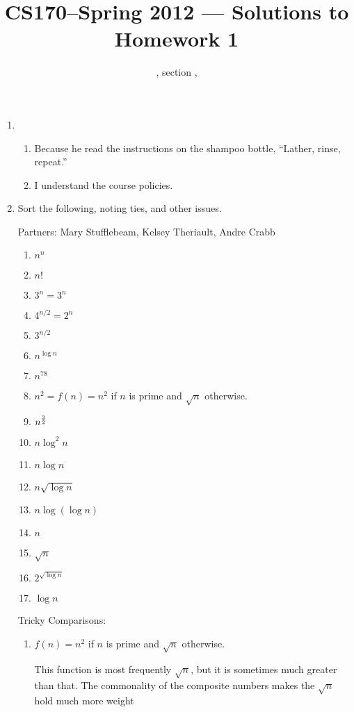 \documentclass[11pt]{article}
\title{CS170--Spring 2012 --- Solutions to Homework 1}
\author{\Name, section \Sec, \texttt{\Login}}
\begin{document}
\maketitle

\begin{enumerate}
\item 

\begin{enumerate}

\item
Because he read the instructions on the shampoo bottle, ``Lather, rinse,
repeat.''

\item 
I understand the course policies.
\end{enumerate}

\newpage

\item 

Sort the following, noting ties, and other issues.

Partners: Mary Stufflebeam, Kelsey Theriault, Andre Crabb
\begin{enumerate}
\item $n^n$
\item $n!$
\item $3^n = 3^n$
\item $4^{n/2} = 2^n$
\item $3^{n/2}$
\item $n^{\log n}$
\item $n^{78}$
\item $n^2  = f(n) = n^2$ if $n$ is prime and $\sqrt{n}$ otherwise.
\item $n^{3\over 2}$
\item $n\log^2n$
\item $n\log n$
\item $n\sqrt{\log n}$
\item $n\log(\log n)$
\item $n$
\item $\sqrt{n}$
\item $2^{\sqrt{\log n}}$
\item $\log n$
\end{enumerate}

Tricky Comparisons:
\begin{enumerate}
\item $f(n) = n^2$ if $n$ is prime and $\sqrt{n}$ otherwise. 

This function is most frequently $\sqrt{n}$, but it is sometimes much greater
than that. The commonality of the composite numbers makes the $\sqrt{n}$ hold
much more weight


\end{enumerate}
\end{enumerate}
\end{document}
